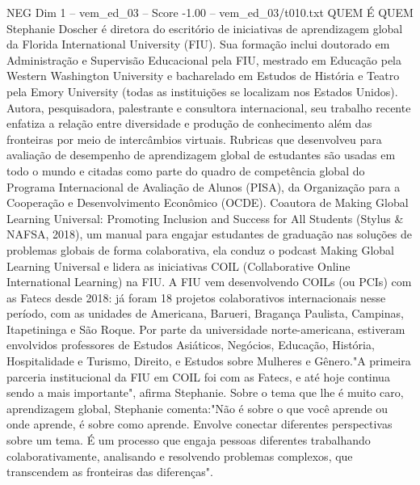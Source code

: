 \begin{textsample}{NEG Dim 1 – vem\_ed\_03 – Score -1.00 – vem\_ed\_03/t010.txt}  \label{ex:f1_neg_057}
QUEM É QUEM Stephanie Doscher é diretora do escritório de iniciativas de aprendizagem global da Florida International University (FIU).
Sua formação inclui doutorado em Administração e Supervisão Educacional pela FIU, mestrado em Educação pela Western Washington University e bacharelado em Estudos de História e Teatro pela Emory University (todas as instituições se localizam nos Estados Unidos).
Autora, pesquisadora, palestrante e consultora internacional, seu trabalho recente enfatiza a relação entre diversidade e produção de conhecimento além das fronteiras por meio de intercâmbios virtuais.
Rubricas que desenvolveu para avaliação de desempenho de aprendizagem global de estudantes são usadas em todo o mundo e citadas como parte do quadro de competência global do Programa Internacional de Avaliação de Alunos (PISA), da Organização para a Cooperação e Desenvolvimento Econômico (OCDE).
Coautora de Making Global Learning Universal: Promoting Inclusion and Success for All Students (Stylus \& NAFSA, 2018), um manual para engajar estudantes de graduação nas soluções de problemas globais de forma colaborativa, ela conduz o podcast Making Global Learning Universal e lidera as iniciativas COIL (Collaborative Online International Learning) na FIU.
A FIU vem desenvolvendo COILs (ou PCIs) com as Fatecs desde 2018: já foram 18 projetos colaborativos internacionais nesse período, com as unidades de Americana, Barueri, Bragança Paulista, Campinas, Itapetininga e São Roque.
Por parte da universidade norte-americana, estiveram envolvidos professores de Estudos Asiáticos, Negócios, Educação, História, Hospitalidade e Turismo, Direito, e Estudos sobre Mulheres e Gênero."A primeira parceria institucional da FIU em COIL foi com as Fatecs, e até hoje continua sendo a mais importante", afirma Stephanie.
Sobre o tema que lhe é muito caro, aprendizagem global, Stephanie comenta:"Não é sobre o que você aprende ou onde aprende, é sobre como aprende.
Envolve conectar diferentes perspectivas sobre um tema.
É um processo que engaja pessoas diferentes trabalhando colaborativamente, analisando e resolvendo problemas complexos, que transcendem as fronteiras das diferenças".

\end{textsample}
